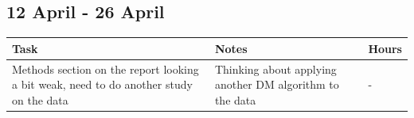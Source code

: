 \documentclass[11pt, oneside]{article}   	%
\begin{document}
\subsection{12 April - 26 April}
\begin{tabularx}{\linewidth}{|X|X|X|}
  \hline
  Task & Notes & Hours \\
  \hline
  Methods section on the report looking a bit weak, need to do another study on the data & Thinking about applying another DM algorithm to the data & - \\
   \hline
\end{tabularx}
\end{document}
